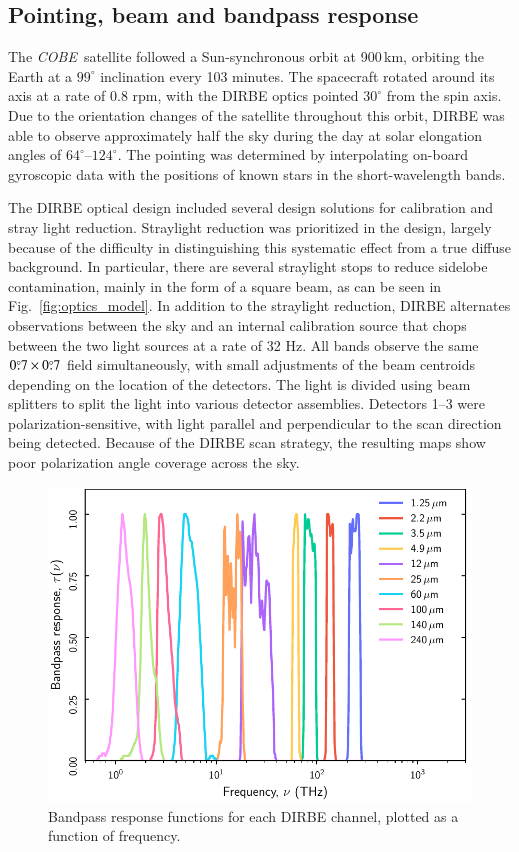 \documentclass{aa}
\def\COBE{\textit{COBE}}
\begin{document}
\subsection{Pointing, beam and bandpass response}


The \COBE\ satellite followed a Sun-synchronous orbit at 900\,km, orbiting the Earth at a $99^\circ$ inclination every 103 minutes. The spacecraft rotated around its axis at a rate of 0.8 rpm, with the DIRBE optics pointed $30^\circ$ from the spin axis. Due to the orientation changes of the satellite throughout this orbit, DIRBE was able to observe approximately half the sky during the day at solar elongation angles of $64^\circ$--$124^\circ$.
The pointing was determined by interpolating on-board gyroscopic data with the positions of known stars in the short-wavelength bands.

The DIRBE optical design included several design solutions for calibration and stray light reduction. Straylight reduction was prioritized in the design, largely because of the difficulty in distinguishing this systematic effect from a true diffuse background. In particular, there are several straylight stops to reduce sidelobe contamination, mainly in the form of a square beam, as can be seen in Fig.~\ref{fig:optics_model}. In addition to the straylight reduction, DIRBE alternates observations between the sky and an internal calibration source that chops between the two light sources at a rate of 32 Hz.
All bands observe the same $0\overset{\circ}{.}7\times0\overset{\circ}{.}7$  field simultaneously, with small adjustments of the beam centroids depending on the location of the detectors. The light is divided using beam splitters to split the light into various detector assemblies. Detectors 1--3 were polarization-sensitive, with light parallel and perpendicular to the scan direction being detected. Because of the DIRBE scan strategy, the resulting maps show poor polarization angle coverage across the sky.

\begin{figure}
  \centering
  \includegraphics[width=\linewidth]{figs/DIRBE_bp.pdf}
  \caption{Bandpass response functions for each DIRBE channel, plotted as a function of frequency.}
  \label{fig:bandpass}
\end{figure}
\end{document}
